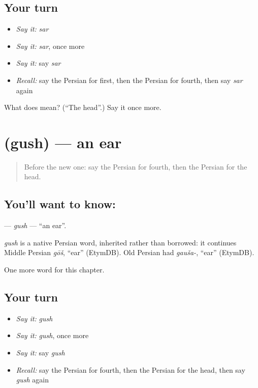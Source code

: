 \subsection*{Your turn}
\begin{itemize}
\raggedright
  \item \emph{Say it:} \emph{sar}
  \item \emph{Say it:} \emph{sar}, once more
  \item \emph{Say it:} say \emph{sar}
  \item \emph{Recall:} say the Persian for first, then the Persian for fourth, then say \emph{sar} again
\end{itemize}

\begin{tcolorbox}[breakable,colback=teal!4,colframe=teal!35!black,title={Before you move on}]
What does  mean? (\textquotedblleft{}The head\textquotedblright{}.) Say it once more.
\end{tcolorbox}
\section[\texorpdfstring{\fa{گوش} (gush)}{گوش (gush)}]{ (gush) — an ear}

\label{lesson:FA-C27-gush}



\begin{quote}
Before the new one: say the Persian for fourth, then the Persian for the head.
\end{quote}

\subsection*{You'll want to know: }
\textbf{} — \emph{gush} — \textquotedblleft{}an ear\textquotedblright{}.

\begin{cousinweb}
\emph{gush} is a native Persian word, inherited rather than borrowed: it continues Middle Persian \emph{gōš}, \textquotedblleft{}ear\textquotedblright{} (EtymDB). Old Persian had \emph{gauša-}, \textquotedblleft{}ear\textquotedblright{} (EtymDB).
\end{cousinweb}

\begin{grammarlens}[title={What you've built}]
One more word for this chapter.
\end{grammarlens}

\subsection*{Your turn}
\begin{itemize}
\raggedright
  \item \emph{Say it:} \emph{gush}
  \item \emph{Say it:} \emph{gush}, once more
  \item \emph{Say it:} say \emph{gush}
  \item \emph{Recall:} say the Persian for fourth, then the Persian for the head, then say \emph{gush} again
\end{itemize}

